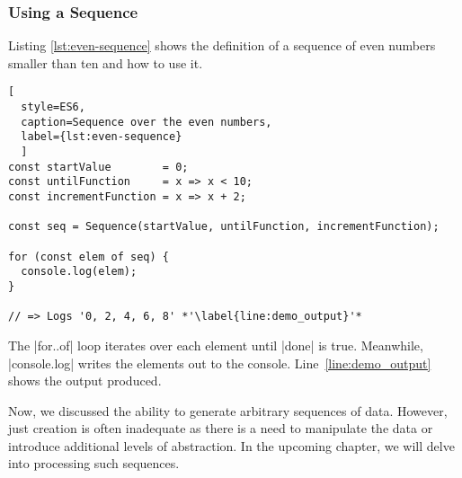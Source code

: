 \subsubsection{Using a Sequence}
\label{subsub:Using a Sequence}
Listing \ref{lst:even-sequence} shows the definition of a sequence of even 
numbers smaller than ten and how to use it. 
\begin{lstlisting}[
  style=ES6, 
  caption=Sequence over the even numbers,
  label={lst:even-sequence}
  ]
const startValue        = 0;
const untilFunction     = x => x < 10;
const incrementFunction = x => x + 2;

const seq = Sequence(startValue, untilFunction, incrementFunction);

for (const elem of seq) {
  console.log(elem);
}

// => Logs '0, 2, 4, 6, 8' *'\label{line:demo_output}'*
\end{lstlisting}

The |for..of| loop iterates over each
element until |done| is true. Meanwhile, |console.log| writes the elements out 
to the console. Line~\ref{line:demo_output} shows the output produced.
\newline

Now, we discussed the ability to generate arbitrary sequences of data. However, 
just creation is often inadequate as there is a need to manipulate the data or 
introduce additional levels of abstraction. In the upcoming chapter, we will 
delve into processing such sequences.

